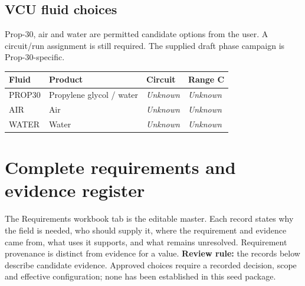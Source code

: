 \documentclass[11pt]{article}
\begin{document}
\subsection*{VCU fluid choices}
Prop-30, air and water are permitted candidate options from the user. A circuit/run assignment is still required. The supplied draft phase campaign is Prop-30-specific.
\small\setlength{\tabcolsep}{4pt}
\begin{longtable}{>{\raggedright\arraybackslash}p{}>{\raggedright\arraybackslash}p{}>{\raggedright\arraybackslash}p{}>{\raggedright\arraybackslash}p{}}
\toprule
\textbf{Fluid} & \textbf{Product} & \textbf{Circuit} & \textbf{Range C} \\\midrule\endhead
PROP30 & Propylene glycol / water & \textit{Unknown} & \textit{Unknown} \\[3pt]
AIR & Air & \textit{Unknown} & \textit{Unknown} \\[3pt]
WATER & Water & \textit{Unknown} & \textit{Unknown} \\[3pt]
\bottomrule\end{longtable}\normalsize
\clearpage\section{Complete requirements and evidence register}\label{requirements}
The Requirements workbook tab is the editable master. Each record states why the field is needed, who should supply it, where the requirement and evidence came from, what uses it supports, and what remains unresolved. Requirement provenance is distinct from evidence for a value.
\textbf{Review rule:} the records below describe candidate evidence. Approved choices require a recorded decision, scope and effective configuration; none has been established in this seed package.
\end{document}
